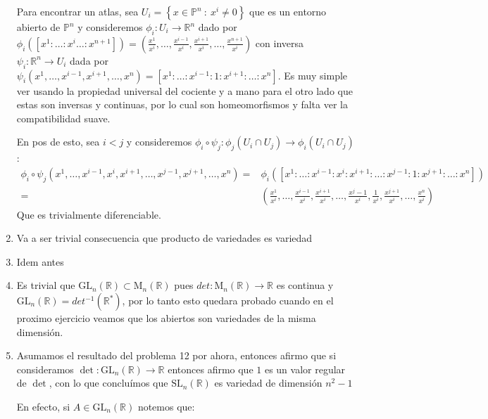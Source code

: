 \documentclass[11pt]{article}
\newcommand{\R}{{\mathbb{R}}}
\newcommand\tq{~:~}
\newcommand{\sett}[1]{\left\lbrace#1\right\rbrace}
\numberwithin{theorem}{subsection}
\begin{document}
\begin{solution}
\begin{enumerate}
		Para encontrar un atlas, sea $U_i = \sett{x \in \mathbb{P}^{n} \tq x^i \neq 0}$ que es un entorno abierto de $\mathbb{P}^n$ y consideremos $\phi_i : U_i \rightarrow \R^{n}$ dado por $\phi_i([x^1:\dots:x^i\dots:x^{n+1}]) = (\frac{x^1}{x^i}, \dots, \frac{x^{i-1}}{x^i}, \frac{x^{i+1}}{x^i}, \dots, \frac{x^{n+1}}{x^i})$ con inversa $\psi_i : \R^n \rightarrow U_i$ dada por $\psi_i(x^1, \dots, x^{i-1}, x^{i+1}, \dots, x^n) = [x^1 : \dots : x^{i-1}:1:x^{i+1}: \dots : x^n]$. Es muy simple ver usando la propiedad universal del cociente y a mano para el otro lado que estas son inversas y continuas, por lo cual son homeomorfismos y falta ver la compatibilidad suave.
		
		En pos de esto, sea $i < j$ y consideremos $\phi_i \circ \psi_j : \phi_j(U_i \cap U_j) \rightarrow \phi_i(U_i \cap U_j)$:
		\small
		\begin{equation*}
			\begin{aligned}
			\phi_i \circ \psi_j (x^1, \dots, x^{i-1}, x^{i}, x^{i+1}, \dots, x^{j-1}, x^{j+1}, \dots , x^n) = & \phi_i([x^1:\dots:x^{i-1}:x^{i}:x^{i+1}:\dots:x^{j-1}:1:x^{j+1}:\dots:x^n]) \\
			= &  (\frac{x^1}{x^i}, \dots, \frac{x^{i-1}}{x^i}, \frac{x^{i+1}}{x^i}, \dots, \frac{x^j-1}{x^i}, \frac{1}{x^i}, \frac{x^{j+1}}{x^i}, \dots, \frac{x^n}{x^i})
			\end{aligned}
		\end{equation*}
		\normalsize
		Que es trivialmente diferenciable.
		
		\item  Va a ser trivial consecuencia que producto de variedades es variedad 
		
		\item Idem antes
		
		\item Es trivial que $\mathrm{GL}_n(\R) \subset \mathrm{M}_n(\R)$ pues $det: \mathrm{M}_n(\R) \rightarrow \R$ es continua y $\mathrm{GL}_n(\R) = det^{-1}(\R^{\ast})$, por lo tanto esto quedara probado cuando en el proximo ejercicio veamos que los abiertos son variedades de la misma dimensi\'on.
		
		\item Asumamos el resultado del problema 12 por ahora, entonces afirmo que si consideramos $\det: \mathrm{GL}_n(\R) \rightarrow \R$ entonces afirmo que $1$ es un valor regular de $\det$, con lo que conclu\'imos que $\mathrm{SL}_n(\R)$ es variedad de dimensi\'on $n^2 -1$
		
		En efecto, si $A \in \mathrm{GL}_n(\R) $ notemos que:
		

\end{enumerate}
\end{solution}
\end{document}
